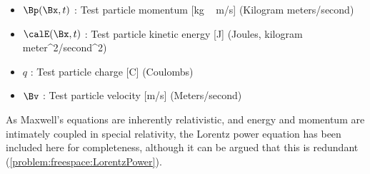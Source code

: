 \begin{itemize}
	\item \( \Bp(\Bx, t) \) : Test particle momentum [\si{kg\, m/s}] (Kilogram meters/second)
	\item \( \calE(\Bx, t) \) : Test particle kinetic energy [\si{J}] (Joules, kilogram meter^2/second^2)
	\item \( q \) : Test particle charge [\si{C}] (Coulombs)
	\item \( \Bv \) : Test particle velocity [\si{m/s}] (Meters/second)
\end{itemize}

As Maxwell's equations are inherently relativistic, and
energy and momentum are intimately coupled in special relativity,
the Lorentz power equation has been included here for completeness, although it can be argued that this is redundant
(\cref{problem:freespace:LorentzPower}).

